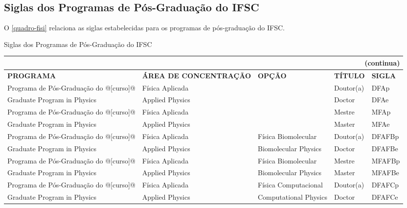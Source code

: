 \begin{apendicesenv}
\chapter{Siglas dos Programas de Pós-Graduação do IFSC}
O \autoref{quadro-fisi} relaciona as siglas estabelecidas para os programas de pós-graduação do IFSC.
\begin{quadro}[htb] 
	\ABNTEXfontereduzida
	\caption[Siglas dos Programas de Pós-Graduação do IFSC]{Siglas dos Programas de Pós-Graduação do IFSC}
	\label{quadro-fisi}
	\begin{tabular}{|p{3.5cm}|p{3.5cm}|p{3.5cm}|p{1.5cm}|p{2.25cm}|}
	\multicolumn{5}{r}{{(continua)}} \\ 
    \hline
		\textbf{PROGRAMA} & \textbf{ÁREA DE CONCENTRAÇÃO} & \textbf{OPÇÃO} & \textbf{TÍTULO} & \textbf{SIGLA}  \\
		\hline
		Programa de Pós-Graduação do @[curso]@& Física Aplicada &  & Doutor(a) & DFAp\\
		Graduate Program in Physics & Applied Physics &  & Doctor & DFAe\\
		Programa de Pós-Graduação do @[curso]@& Física Aplicada &  & Mestre & MFAp\\
		Graduate Program in Physics & Applied Physics &  & Master & MFAe\\
		Programa de Pós-Graduação do @[curso]@& Física Aplicada & Física Biomolecular & Doutor(a) & DFAFBp\\
		Graduate Program in Physics & Applied Physics & Biomolecular Physics & Doctor & DFAFBe\\
		Programa de Pós-Graduação do @[curso]@& Física Aplicada & Física Biomolecular & Mestre & MFAFBp\\
		Graduate Program in Physics & Applied Physics & Biomolecular Physics & Master & MFAFBe\\
		Programa de Pós-Graduação do @[curso]@& Física Aplicada & Física Computacional & Doutor(a) & DFAFCp\\
		Graduate Program in Physics & Applied Physics & Computational Physics & Doctor & DFAFCe\\		

	\end{tabular}
\end{quadro}


\end{apendicesenv}

